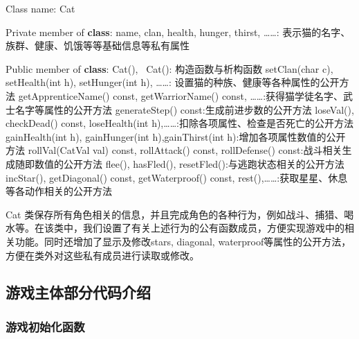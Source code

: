 \documentclass[hyperref,UTF8,a4paper]{ctexart}
\newenvironment{Shaded}{}{}
\newcommand{\AttributeTok}[1]{\textcolor[rgb]{0.49,0.56,0.16}{#1}}
\newcommand{\DataTypeTok}[1]{\textcolor[rgb]{0.56,0.13,0.00}{#1}}
\newcommand{\KeywordTok}[1]{\textcolor[rgb]{0.00,0.44,0.13}{\textbf{#1}}}
\newcommand{\NormalTok}[1]{#1}
\begin{document}
\begin{Shaded}
\begin{Highlighting}[]
\NormalTok{Class name: Cat}
    
\NormalTok{Private member of }\KeywordTok{class}\NormalTok{: }
\NormalTok{    name, clan, health, hunger, thirst, ……: 表示猫的名字、族群、健康、饥饿等等基础信息等私有属性}

\NormalTok{Public member of }\KeywordTok{class}\NormalTok{:}
\NormalTok{    Cat(), ~Cat(): 构造函数与析构函数}
\NormalTok{    setClan(}\DataTypeTok{char}\NormalTok{ c), setHealth(}\DataTypeTok{int}\NormalTok{ h), setHunger(}\DataTypeTok{int}\NormalTok{ h), ……: 设置猫的种族、健康等各种属性的公开方法}
\NormalTok{    getApprenticeName() }\AttributeTok{const}\NormalTok{, getWarriorName() }\AttributeTok{const}\NormalTok{, ……:获得猫学徒名字、武士名字等属性的公开方法}
\NormalTok{    generateStep() }\AttributeTok{const}\NormalTok{:生成前进步数的公开方法}
\NormalTok{    loseVal(), checkDead() }\AttributeTok{const}\NormalTok{, loseHealth(}\DataTypeTok{int}\NormalTok{ h),……:扣除各项属性、检查是否死亡的公开方法}
\NormalTok{    gainHealth(}\DataTypeTok{int}\NormalTok{ h), gainHunger(}\DataTypeTok{int}\NormalTok{ h),gainThirst(}\DataTypeTok{int}\NormalTok{ h):增加各项属性数值的公开方法}
\NormalTok{    rollVal(CatVal val) }\AttributeTok{const}\NormalTok{, rollAttack() }\AttributeTok{const}\NormalTok{, rollDefense() }\AttributeTok{const}\NormalTok{:战斗相关生成随即数值的公开方法}
\NormalTok{    flee(), hasFled(), resetFled():与逃跑状态相关的公开方法}
\NormalTok{    incStar(), getDiagonal() }\AttributeTok{const}\NormalTok{, getWaterproof() }\AttributeTok{const}\NormalTok{, rest(),……:获取星星、休息等各动作相关的公开方法}
\end{Highlighting}
\end{Shaded}

Cat
类保存所有角色相关的信息，并且完成角色的各种行为，例如战斗、捕猎、喝水等。在该类中，我们设置了有关上述行为的公有函数成员，方便实现游戏中的相关功能。同时还增加了显示及修改stars,
diagonal,
waterproof等属性的公开方法，方便在类外对这些私有成员进行读取或修改。

\hypertarget{ux6e38ux620fux4e3bux4f53ux90e8ux5206ux4ee3ux7801ux4ecbux7ecd}{%
\subsection{游戏主体部分代码介绍}\label{ux6e38ux620fux4e3bux4f53ux90e8ux5206ux4ee3ux7801ux4ecbux7ecd}}

\hypertarget{ux6e38ux620fux521dux59cbux5316ux51fdux6570}{%
\subsubsection{游戏初始化函数}\label{ux6e38ux620fux521dux59cbux5316ux51fdux6570}}
\end{document}
